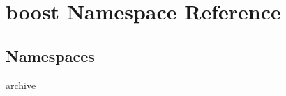 \hypertarget{namespaceboost}{}\section{boost Namespace Reference}
\label{namespaceboost}
\subsection*{Namespaces}
\begin{DoxyCompactItemize}
\item 
 \hyperlink{namespaceboost_1_1archive}{archive}
\end{DoxyCompactItemize}
